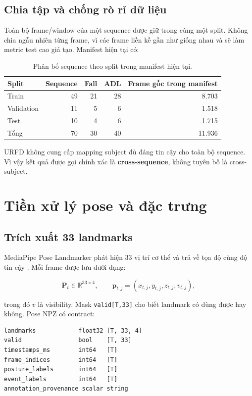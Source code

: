 \documentclass[12pt,a4paper,oneside]{report}
\newcommand{\code}[1]{\texttt{#1}}
\begin{document}
\section{Chia tập và chống rò rỉ dữ liệu}

Toàn bộ frame/window của một sequence được giữ trong cùng một split. Không chia
ngẫu nhiên từng frame, vì các frame liền kề gần như giống nhau và sẽ làm metric
test cao giả tạo. Manifest hiện tại có:

\begin{table}[H]
\centering
\caption{Phân bố sequence theo split trong manifest hiện tại.}
\begin{tabular}{lrrrr}
\toprule
Split & Sequence & Fall & ADL & Frame gốc trong manifest \\
\midrule
Train & 49 & 21 & 28 & 8.703 \\
Validation & 11 & 5 & 6 & 1.518 \\
Test & 10 & 4 & 6 & 1.715 \\
\midrule
Tổng & 70 & 30 & 40 & 11.936 \\
\bottomrule
\end{tabular}
\end{table}

URFD không cung cấp mapping subject đủ đáng tin cậy cho toàn bộ sequence. Vì
vậy kết quả được gọi chính xác là \textbf{cross-sequence}, không tuyên bố là
cross-subject.

\chapter{Tiền xử lý pose và đặc trưng}

\section{Trích xuất 33 landmarks}

MediaPipe Pose Landmarker phát hiện 33 vị trí cơ thể và trả về tọa độ cùng độ
tin cậy \cite{mediapipepose}. Mỗi frame được lưu dưới dạng:

\[
\mathbf{P}_t \in \mathbb{R}^{33\times 4},\qquad
\mathbf{p}_{t,j}=(x_{t,j},y_{t,j},z_{t,j},v_{t,j}),
\]

trong đó $v$ là visibility. Mask \code{valid[T,33]} cho biết landmark có dùng
được hay không. Pose NPZ có contract:

\begin{lstlisting}
landmarks            float32 [T, 33, 4]
valid                bool    [T, 33]
timestamps_ms        int64   [T]
frame_indices        int64   [T]
posture_labels       int64   [T]
event_labels         int64   [T]
annotation_provenance scalar string
\end{lstlisting}
\end{document}
